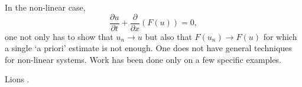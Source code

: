 In the non-linear case,
\begin{equation*}
\frac{\partial u}{\partial t} + \frac{\partial}{\partial x} (F(u)) =
0, \tag{4.23}\label{eq4.23}
\end{equation*}
one not only has to show that $u_n \to u$ but also that $F(u_n) \to
F(u)$ for which a single `a priori' estimate is not enough. One does
not have general techniques for non-linear systems. Work has been done
only on a few specific examples.

\medskip
{}  Lions \cite{key26}.


